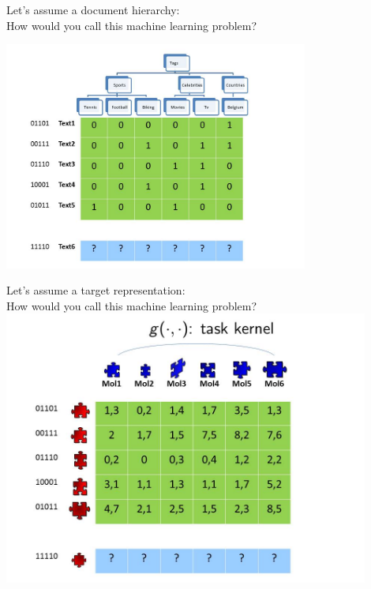 \documentclass[]{beamer}
\begin{document}
\begin{frame}{Let's assume a document hierarchy: \\
How would you call this machine learning problem?}
\begin{center}
\includegraphics[width=0.75\textwidth,trim = 0 0 100 0,clip]{Figures/pictures/Slide5}
\end{center}
\end{frame}

\begin{frame}{Let's assume a target representation: \\
How would you call this machine learning problem?}
\vspace{0.8cm}
\includegraphics[width=0.9\textwidth,trim = 0 0 0 90,clip]{Figures/pictures/Slide4}

\end{frame}
\end{document}
